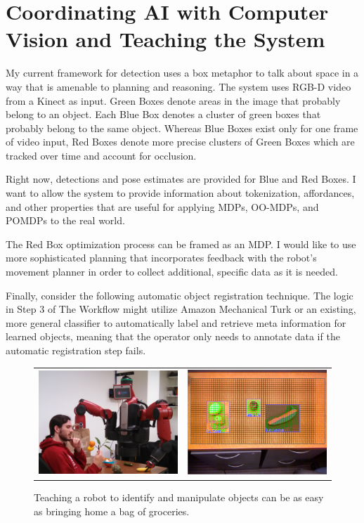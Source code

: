 \documentclass[12pt]{article}
\numberwithin{equation}{section}
\numberwithin{table}{section}
\numberwithin{figure}{section}
\begin{document}
\section{Coordinating AI with Computer Vision and Teaching the System}
My current framework for detection uses a box metaphor to talk about space in a way that 
is amenable to planning and reasoning. The system uses RGB-D video from a Kinect as input.
Green Boxes denote areas in the image that probably belong to an object. Each Blue Box denotes
a cluster of green boxes that probably belong to the same object. Whereas Blue Boxes exist only for
one frame of video input, Red Boxes denote more precise clusters of Green Boxes which are tracked over time 
and account for occlusion.

Right now, detections and pose estimates are provided for Blue and Red Boxes. I want to allow the system
to provide information about tokenization, affordances, and other properties that are useful for applying
MDPs\cite{MDP}, OO-MDPs\cite{OOMDP}, and POMDPs\cite{POMDP} to the real world.

The Red Box optimization process can be framed as an MDP. I would like to use more sophisticated planning
that incorporates feedback with the robot's movement planner in order to collect additional, specific data 
as it is needed.

Finally, consider the following automatic object registration technique.  
The logic in Step 3 of The Workflow might utilize Amazon Mechanical Turk 
or an existing, more general classifier to automatically label and retrieve meta information for learned 
objects, meaning that the operator only needs to annotate data if the automatic registration step fails.

\begin{figure}
  \begin{center}
    \begin{tabular}{l c}
      \includegraphics[width=200px, height=150px]{robo2.png} &
      \includegraphics[width=200px, height=150px]{screen2.png} \\
    \end{tabular}
  \end{center}
  \caption{Teaching a robot to identify and manipulate objects can be as easy as bringing home
	    a bag of groceries.}
\end{figure}
\end{document}
